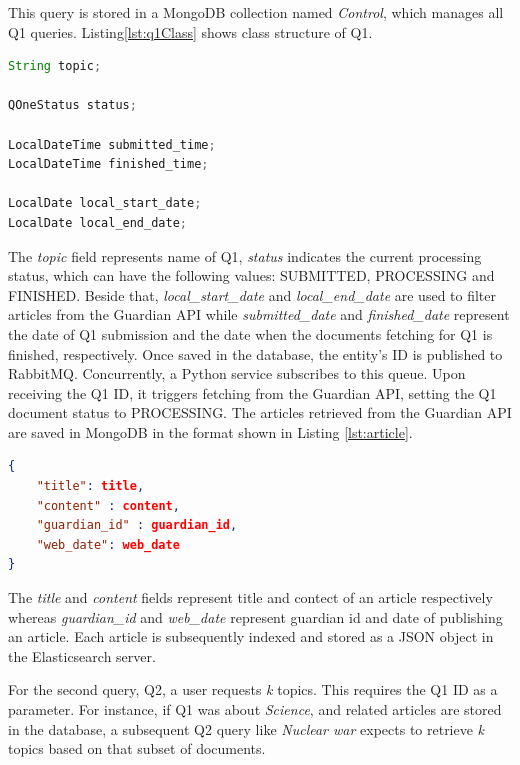 This query is stored in a MongoDB collection named \textit{Control}, which manages all Q1 queries.
Listing\ref{lst:q1Class} shows class structure of Q1.

\begin{lstlisting}[language=Java, caption={Class definition of QOne}, label={lst:q1Class}]
String topic;

QOneStatus status;

LocalDateTime submitted_time;
LocalDateTime finished_time;

LocalDate local_start_date;
LocalDate local_end_date;
\end{lstlisting}

The \textit{topic} field represents name of Q1, \textit{status} indicates the current processing status, which can
have the following values: SUBMITTED, PROCESSING and FINISHED. Beside that, \textit{local\_start\_date} and
\textit{local\_end\_date} are used to filter articles from the Guardian API while \textit{submitted\_date} and
\textit{finished\_date} represent the date of Q1 submission and the date when the documents fetching for Q1 is finished,
respectively. Once saved in the database, the entity's ID is published to RabbitMQ.
\newline
Concurrently, a Python service subscribes to this queue. Upon receiving the Q1 ID, it triggers fetching from
the Guardian API, setting the Q1 document status to PROCESSING. The articles retrieved from the Guardian API are saved
in MongoDB in the format shown in Listing \ref{lst:article}.

\begin{lstlisting}[language=json, caption={JSON representation of a Guardian Article}, label={lst:article}]
{
    "title": title,
    "content" : content,
    "guardian_id" : guardian_id,
    "web_date": web_date
}
\end{lstlisting}

The \textit{title} and \textit{content} fields represent title and contect of an article respectively whereas
\textit{guardian\_id} and \textit{web\_date} represent guardian id and date of publishing an article. Each article
is subsequently indexed and stored as a JSON object in the Elasticsearch server.

For the second query, Q2, a user requests \textit{k} topics. This requires the Q1 ID as a parameter. For instance,
if Q1 was about \textit{Science}, and related articles are stored in the database, a subsequent Q2 query like
\textit{Nuclear war} expects to retrieve \textit{k} topics based on that subset of documents.

